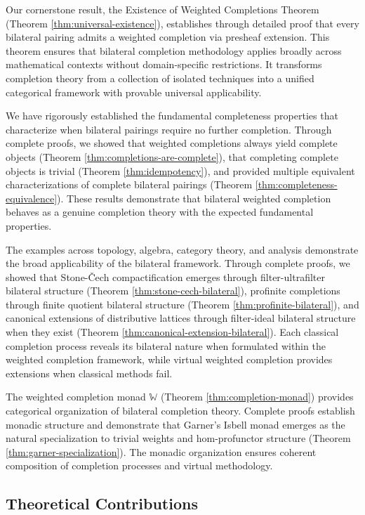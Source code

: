 \documentclass[11pt]{article}
\theoremstyle{plain}
\theoremstyle{definition}
\theoremstyle{remark}
\begin{document}
Our cornerstone result, the Existence of Weighted Completions Theorem (Theorem \ref{thm:universal-existence}), establishes through detailed proof that every bilateral pairing admits a weighted completion via presheaf extension. This theorem ensures that bilateral completion methodology applies broadly across mathematical contexts without domain-specific restrictions. It transforms completion theory from a collection of isolated techniques into a unified categorical framework with provable universal applicability.

We have rigorously established the fundamental completeness properties that characterize when bilateral pairings require no further completion. Through complete proofs, we showed that weighted completions always yield complete objects (Theorem \ref{thm:completions-are-complete}), that completing complete objects is trivial (Theorem \ref{thm:idempotency}), and provided multiple equivalent characterizations of complete bilateral pairings (Theorem \ref{thm:completeness-equivalence}). These results demonstrate that bilateral weighted completion behaves as a genuine completion theory with the expected fundamental properties.

The examples across topology, algebra, category theory, and analysis demonstrate the broad applicability of the bilateral framework. Through complete proofs, we showed that Stone-\v{C}ech compactification emerges through filter-ultrafilter bilateral structure (Theorem \ref{thm:stone-cech-bilateral}), profinite completions through finite quotient bilateral structure (Theorem \ref{thm:profinite-bilateral}), and canonical extensions of distributive lattices through filter-ideal bilateral structure when they exist (Theorem \ref{thm:canonical-extension-bilateral}). Each classical completion process reveals its bilateral nature when formulated within the weighted completion framework, while virtual weighted completion provides extensions when classical methods fail.

The weighted completion monad $\mathbb{W}$ (Theorem \ref{thm:completion-monad}) provides categorical organization of bilateral completion theory. Complete proofs establish monadic structure and demonstrate that Garner's Isbell monad \cite{garner2018isbell} emerges as the natural specialization to trivial weights and hom-profunctor structure (Theorem \ref{thm:garner-specialization}). The monadic organization ensures coherent composition of completion processes and virtual methodology.

\subsection{Theoretical Contributions}
\end{document}
